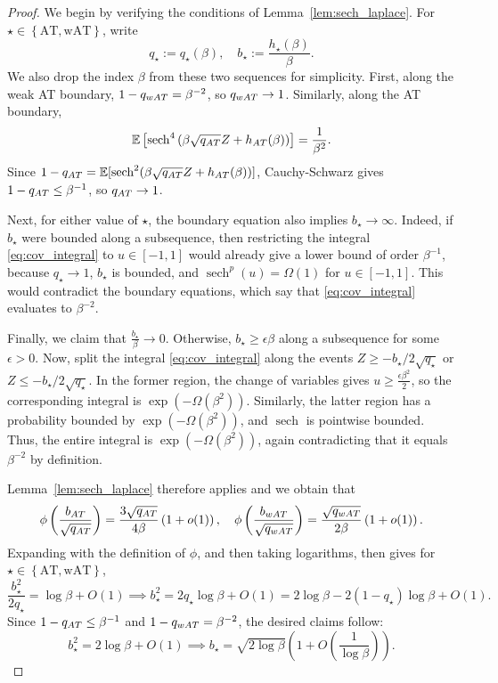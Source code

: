 \documentclass[10pt,a4paper]{amsart}
\newcommand{\Brace}[1]{\left\{#1\right\}}
\newcommand{\Brack}[1]{\left[#1\right]}
\newcommand{\Par}[1]{\left(#1\right)}
\newcommand{\bbE}{{\mathbb{E}}}
\newcommand{\defeq}{:=}
\newcommand{\eps}{\epsilon}
\newcommand{\sech}{\operatorname{sech}}
\begin{document}
\begin{proof}
We begin by verifying the conditions of Lemma~\ref{lem:sech_laplace}. For $\star\in\Brace{\mathrm{AT},\mathrm{wAT}}$, write
\[
    q_\star\defeq q_\star(\beta),
    \quad
    b_\star\defeq \frac{h_\star(\beta)}{\beta}.
\]
We also drop the index $\beta$ from these two sequences for simplicity.
First, along the weak AT boundary,
$1-q_{\rm wAT}=\beta^{-2}$, so $q_{\rm wAT}\to1$. Similarly, along the AT boundary,
\[
    \bbE\Brack{
        \operatorname{sech}^4
        \Par{
            \beta\sqrt {q_{\rm AT}} Z+h_{\rm AT}(\beta)
        }
    }
    =
    \frac{1}{\beta^2}.
\]
Since
$1-q_{\rm AT}=\bbE[\operatorname{sech}^2(\beta\sqrt {q_{\rm AT}} Z+h_{\rm AT}(\beta))]$,
Cauchy-Schwarz gives $1-q_{\rm AT}\le\beta^{-1}$, so
$q_{\rm AT}\to1$.

Next, for either value of $\star$, the boundary equation also implies
$b_\star \to\infty$. Indeed, if $b_\star$
were bounded along a subsequence, then restricting the integral \eqref{eq:cov_integral} to
$u\in[-1,1]$ would already give a lower bound of order $\beta^{-1}$, because $q_\star \to 1$, $b_\star$ is bounded, and $\sech^p(u) = \Omega(1)$ for $u \in [-1, 1]$. This would
contradict the boundary equations, which say that \eqref{eq:cov_integral} evaluates to $\beta^{-2}$.


Finally, we claim that $\frac{b_\star}{\beta} \to0$.  Otherwise, $b_\star\ge\eps\beta$ along a subsequence
for some $\eps>0$. Now, split the integral \eqref{eq:cov_integral} along the events $Z \ge -b_\star / 2\sqrt{q_\star}$ or $Z \le -b_\star / 2\sqrt{q_\star}$. In the former region, the change of variables gives $u \ge \frac{\eps\beta^2}{2}$, so the corresponding integral is $\exp(-\Omega(\beta^2))$. Similarly, the latter region has a probability bounded by $\exp(-\Omega(\beta^2))$, and $\sech$ is pointwise bounded. Thus, the entire integral is $\exp(-\Omega(\beta^2))$, again contradicting that it equals $\beta^{-2}$ by definition.

Lemma~\ref{lem:sech_laplace} therefore applies and we obtain that 
\[
    \phi\Par{
        \frac{
            b_{\rm AT}
        }{
            \sqrt {q_{\rm AT}}
        }
    }
    =
    \frac{
        3\sqrt {q_{\rm AT}}
    }{
        4\beta
    }
    \Par{1+o(1)}, 
    \quad 
    \phi\Par{
        \frac{
            b_{\rm wAT}
        }{
            \sqrt {q_{\rm wAT}}
        }
    }
    =
    \frac{
        \sqrt {q_{\rm wAT}}
    }{
        2\beta
    }
    \Par{1+o(1)}.
\]
Expanding with the definition of $\phi$, and then taking logarithms, then gives for
$\star\in\Brace{\mathrm{AT},\mathrm{wAT}}$,
\[
    \frac{b_\star^2}{2q_\star}
    =
    \log\beta+O(1) \implies b_\star^2 = 2q_\star \log\beta + O(1) = 2\log\beta - 2(1-q_\star)\log\beta + O(1).
\]
Since $1-q_{\rm AT}\le\beta^{-1}$ and
$1-q_{\rm wAT}=\beta^{-2}$, the desired claims follow:
\[
    b_\star^2
    =
    2\log\beta+O(1) \implies
    b_\star
    =
    \sqrt{2\log\beta}
    \Par{1+O\Par{\frac{1}{\log\beta}}}.
\]
\end{proof}
\end{document}

